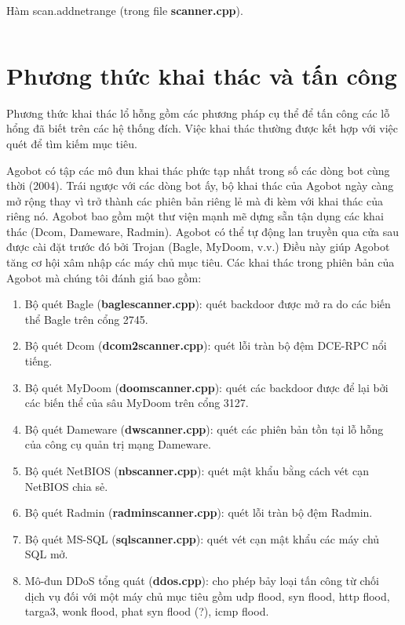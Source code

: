 \begin{listing}[ht]
	\caption{Hàm scan.addnetrange (trong file \textbf{scanner.cpp}).}\label{code:netscan}
	\inputminted{cpp}{./listings/netscan.cpp}
\end{listing}

\section{Phương thức khai thác và tấn công}
Phương thức khai thác lổ hỗng gồm các phương pháp cụ thể để tấn công các lỗ hổng đã biết trên các hệ thống đích.
Việc khai thác thường được kết hợp với việc quét để tìm kiếm mục tiêu.

Agobot có tập các mô đun khai thác phức tạp nhất trong số các dòng bot cùng thời (2004).
Trái ngược với các dòng bot ấy, bộ khai thác của Agobot ngày càng mở rộng thay vì trở thành các phiên bản riêng lẻ mà đi kèm với khai thác của riêng nó.
Agobot bao gồm một thư viện mạnh mẽ dựng sẵn tận dụng các khai thác (Dcom, Dameware, Radmin).
Agobot có thể tự động lan truyền qua cửa sau được cài đặt trước đó bởi Trojan (Bagle, MyDoom, v.v.)
Điều này giúp Agobot tăng cơ hội xâm nhập các máy chủ mục tiêu.
Các khai thác trong phiên bản của Agobot mà chúng tôi đánh giá bao gồm:

\begin{enumerate}
\item Bộ quét Bagle (\textbf{baglescanner.cpp}):
	quét backdoor được mở ra do các biến thể Bagle trên cổng 2745.
\item Bộ quét Dcom (\textbf{dcom2scanner.cpp}):
	quét lỗi tràn bộ đệm DCE-RPC nổi tiếng.
\item Bộ quét MyDoom (\textbf{doomscanner.cpp}):
	quét các backdoor được để lại bởi các biến thể của sâu MyDoom trên cổng 3127.
\item Bộ quét Dameware (\textbf{dwscanner.cpp}):
	quét các phiên bản tồn tại lỗ hỗng của công cụ quản trị mạng Dameware.
\item Bộ quét NetBIOS (\textbf{nbscanner.cpp}):
	quét mật khẩu bằng cách vét cạn NetBIOS chia sẻ.
\item Bộ quét Radmin (\textbf{radminscanner.cpp}):
	quét lỗi tràn bộ đệm Radmin.
\item Bộ quét MS-SQL (\textbf{sqlscanner.cpp}):
	quét vét cạn mật khẩu các máy chủ SQL mở.
\item Mô-đun DDoS tổng quát (\textbf{ddos.cpp}):
	cho phép bảy loại tấn công từ chối dịch vụ đối với một máy chủ mục tiêu gồm
	udp flood,
	syn flood,
	http flood,
	targa3,
	wonk flood,
	phat syn flood (?),
	icmp flood.
\end{enumerate}

